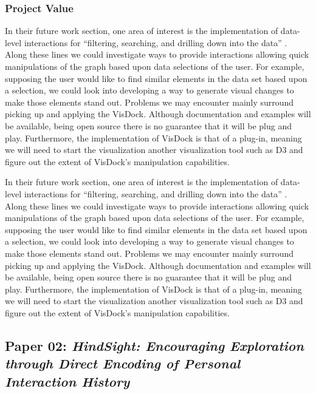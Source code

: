 \documentclass[journal]{vgtc}                %
\begin{document}
        \subsubsection{Project Value}
        In their future work section, one area of interest is the implementation of data-level interactions for ``filtering, searching, and drilling down into the data'' \cite[p.~12]{VisDock:2014}. Along these lines we could investigate ways to provide interactions allowing quick manipulations of the graph based upon data selections of the user. For example, supposing the user would like to find similar elements in the data set based upon a selection, we could look into developing a way to generate visual changes to make those elements stand out. Problems we may encounter mainly surround picking up and applying the VisDock. Although documentation and examples will be available, being open source there is no guarantee that it will be plug and play. Furthermore, the implementation of VisDock is that of a plug-in, meaning we will need to start the visualization another visualization tool such as D3 and figure out the extent of VisDock's manipulation capabilities.

        In their future work section, one area of interest is the implementation of data-level interactions for ``filtering, searching, and drilling down into the data'' \cite[p.~12]{VisDock:2014}.
        Along these lines we could investigate ways to provide interactions allowing quick manipulations of the graph based upon data selections of the user.
        For example, supposing the user would like to find similar elements in the data set based upon a selection, we could look into developing a way to generate visual changes to make those elements stand out.
        Problems we may encounter mainly surround picking up and applying the VisDock.
        Although documentation and examples will be available, being open source there is no guarantee that it will be plug and play.
        Furthermore, the implementation of VisDock is that of a plug-in, meaning we will need to start the visualization another visualization tool such as D3 and figure out the extent of VisDock's manipulation capabilities.

    \subsection{Paper 02: \textit{HindSight: Encouraging Exploration through Direct Encoding of Personal Interaction History} \cite{HindSight:2016}}
\end{document}
